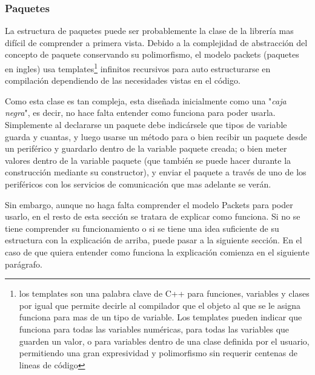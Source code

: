 \documentclass{report}
\begin{document}
\subsubsection{Paquetes}
La estructura de paquetes puede ser probablemente la clase de la librería mas difícil de comprender a primera vista. Debido a la complejidad de abstracción del concepto de paquete conservando su polimorfismo, el modelo packets (paquetes en ingles) usa templates\footnote{los templates son una palabra clave de C++ para funciones, variables y clases por igual que permite decirle al compilador que el objeto al que se le asigna funciona para mas de un tipo de variable. Los templates pueden indicar que funciona para todas las variables numéricas, para todas las variables que guarden un valor, o para variables dentro de una clase definida por el usuario, permitiendo una gran expresividad y polimorfismo sin requerir centenas de lineas de código} infinitos recursivos para auto estructurarse en compilación dependiendo de las necesidades vistas en el código. 
\par \vspace{0.3 cm}
Como esta clase es tan compleja, esta diseñada inicialmente como una "\textit{caja negra}", es decir, no hace falta entender como funciona para poder usarla. Simplemente al declararse un paquete debe indicársele que tipos de variable guarda y cuantas, y luego usarse un método para o bien recibir un paquete desde un periférico y guardarlo dentro de la variable paquete creada; o bien meter valores dentro de la variable paquete (que también se puede hacer durante la construcción mediante su constructor), y enviar el paquete a través de uno de los periféricos con los servicios de comunicación que mas adelante se verán. 
\par \vspace{0.3 cm}
Sin embargo, aunque no haga falta comprender el modelo Packets para poder usarlo, en el resto de esta sección se tratara de explicar como funciona. Si no se tiene comprender su funcionamiento o si se tiene una idea suficiente de su estructura con la explicación de arriba, puede pasar a la siguiente sección. En el caso de que quiera entender como funciona la explicación comienza en el siguiente parágrafo. 
\par \vspace{0.3 cm}
\end{document}
